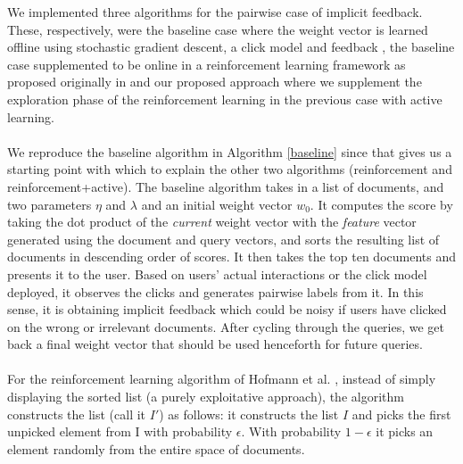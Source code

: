 \documentclass{acm_proc_article-sp}
\begin{document}
We implemented three algorithms for the pairwise case of implicit feedback. These, respectively, were the baseline case where the weight vector is learned offline using stochastic gradient descent, a click model and feedback \cite{joachims}, the baseline case supplemented to be online in a reinforcement learning framework as proposed originally in \cite{hofmann} and our proposed approach where we supplement the exploration phase of the reinforcement learning in the previous case with active learning. \\ \\
We reproduce the baseline algorithm in Algorithm \ref{baseline} since that gives us a starting point with which to explain the other two algorithms (reinforcement and reinforcement+active). The baseline algorithm takes in a list of documents, and two parameters $\eta$ and $\lambda$ and an initial weight vector $w_0$. It computes the score by taking the dot product of the \emph{current} weight vector with the \emph{feature} vector generated using the document and query vectors, and sorts the resulting list of documents in descending order of scores. It then takes the top ten documents and presents it to the user. Based on users' actual interactions or the click model deployed, it observes the clicks and generates pairwise labels from it. In this sense, it is obtaining implicit feedback which could be noisy if users have clicked on the wrong or irrelevant documents. After cycling through the queries, we get back a final weight vector that should be used henceforth for future queries.\\ \\
For the reinforcement learning algorithm of Hofmann et al. \cite{hofmann}, instead of simply displaying the sorted list (a purely exploitative approach), the algorithm constructs the list (call it $I'$) as follows: it constructs the list $I$ and picks the first unpicked element from I with probability $\epsilon$. With probability $1-\epsilon$ it picks an element randomly from the entire space of documents.\\ \\
\end{document}
